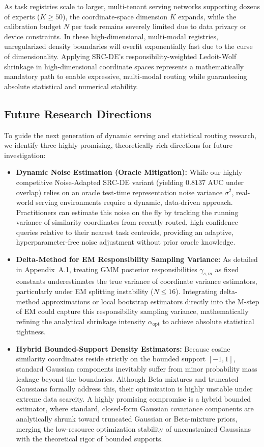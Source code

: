 As task registries scale to larger, multi-tenant serving networks supporting dozens of experts ($K \ge 50$), the coordinate-space dimension $K$ expands, while the calibration budget $N$ per task remains severely limited due to data privacy or device constraints. In these high-dimensional, multi-modal registries, unregularized density boundaries will overfit exponentially fast due to the curse of dimensionality. Applying SRC-DE's responsibility-weighted Ledoit-Wolf shrinkage in high-dimensional coordinate spaces represents a mathematically mandatory path to enable expressive, multi-modal routing while guaranteeing absolute statistical and numerical stability.

\subsection{Future Research Directions}
To guide the next generation of dynamic serving and statistical routing research, we identify three highly promising, theoretically rich directions for future investigation:
\begin{itemize}
    \item {\bf Dynamic Noise Estimation (Oracle Mitigation):} While our highly competitive Noise-Adapted SRC-DE variant (yielding $0.8137$ AUC under overlap) relies on an oracle test-time representation noise variance $\sigma^2$, real-world serving environments require a dynamic, data-driven approach. Practitioners can estimate this noise on the fly by tracking the running variance of similarity coordinates from recently routed, high-confidence queries relative to their nearest task centroids, providing an adaptive, hyperparameter-free noise adjustment without prior oracle knowledge.
    \item {\bf Delta-Method for EM Responsibility Sampling Variance:} As detailed in Appendix~A.1, treating GMM posterior responsibilities $\gamma_{s, m}$ as fixed constants underestimates the true variance of coordinate variance estimators, particularly under EM splitting instability ($N \le 16$). Integrating delta-method approximations or local bootstrap estimators directly into the M-step of EM could capture this responsibility sampling variance, mathematically refining the analytical shrinkage intensity $\alpha_{\text{opt}}$ to achieve absolute statistical tightness.
    \item {\bf Hybrid Bounded-Support Density Estimators:} Because cosine similarity coordinates reside strictly on the bounded support $[-1, 1]$, standard Gaussian components inevitably suffer from minor probability mass leakage beyond the boundaries. Although Beta mixtures and truncated Gaussians formally address this, their optimization is highly unstable under extreme data scarcity. A highly promising compromise is a hybrid bounded estimator, where standard, closed-form Gaussian covariance components are analytically shrunk toward truncated Gaussian or Beta-mixture priors, merging the low-resource optimization stability of unconstrained Gaussians with the theoretical rigor of bounded supports.
\end{itemize}

